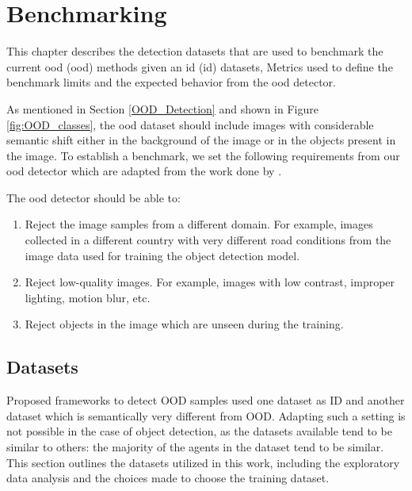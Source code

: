 

    \justifying
    \chapter{Benchmarking}
    \label{Benchmarking}
    This chapter describes the detection datasets that are used to benchmark the current \acrlong{ood} (\acrshort{ood}) methods given an \acrlong{id} (\acrshort{id}) datasets, Metrics used to define the benchmark limits and the expected behavior from the \acrshort{ood} detector. 
    
    As mentioned in Section \ref{OOD_Detection} and shown in Figure \ref{fig:OOD_classes}, the \acrshort{ood} dataset should include images with considerable semantic shift either in the background of the image or in the objects present in the image. To establish a benchmark, we set the following requirements from our \acrshort{ood} detector which are adapted from the work done by \citet{Cao2020}.
    
    The \acrshort{ood} detector should be able to:
    \label{ood_cases}
    \begin{enumerate}
        \item Reject the image samples from a different domain. For example, images collected in a different country with very different road conditions from the image data used for training the object detection model.
        \item Reject low-quality images. For example, images with low contrast, improper lighting, motion blur, etc.
        \item Reject objects in the image which are unseen during the training. 
    \end{enumerate}

    \section{Datasets}
    Proposed frameworks to detect OOD samples used one dataset as ID and another dataset which is semantically very different from OOD. Adapting such a setting is not possible in the case of object detection, as the datasets available tend to be similar to others: the majority of the agents in the dataset tend to be similar. This section outlines the datasets utilized in this work, including the exploratory data analysis and the choices made to choose the training dataset.
    
